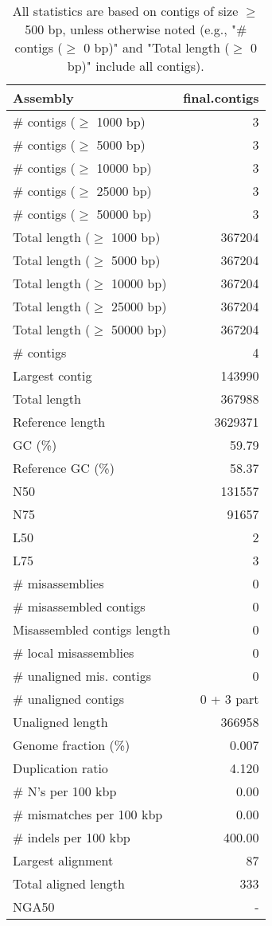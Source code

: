\documentclass[12pt,a4paper]{article}
\begin{document}
\begin{table}[ht]
\begin{center}
\caption{All statistics are based on contigs of size $\geq$ 500 bp, unless otherwise noted (e.g., "\# contigs ($\geq$ 0 bp)" and "Total length ($\geq$ 0 bp)" include all contigs).}
\begin{tabular}{|l*{1}{|r}|}
\hline
Assembly & final.contigs \\ \hline
\# contigs ($\geq$ 1000 bp) & 3 \\ \hline
\# contigs ($\geq$ 5000 bp) & 3 \\ \hline
\# contigs ($\geq$ 10000 bp) & 3 \\ \hline
\# contigs ($\geq$ 25000 bp) & 3 \\ \hline
\# contigs ($\geq$ 50000 bp) & 3 \\ \hline
Total length ($\geq$ 1000 bp) & 367204 \\ \hline
Total length ($\geq$ 5000 bp) & 367204 \\ \hline
Total length ($\geq$ 10000 bp) & 367204 \\ \hline
Total length ($\geq$ 25000 bp) & 367204 \\ \hline
Total length ($\geq$ 50000 bp) & 367204 \\ \hline
\# contigs & 4 \\ \hline
Largest contig & 143990 \\ \hline
Total length & 367988 \\ \hline
Reference length & 3629371 \\ \hline
GC (\%) & 59.79 \\ \hline
Reference GC (\%) & 58.37 \\ \hline
N50 & 131557 \\ \hline
N75 & 91657 \\ \hline
L50 & 2 \\ \hline
L75 & 3 \\ \hline
\# misassemblies & 0 \\ \hline
\# misassembled contigs & 0 \\ \hline
Misassembled contigs length & 0 \\ \hline
\# local misassemblies & 0 \\ \hline
\# unaligned mis. contigs & 0 \\ \hline
\# unaligned contigs & 0 + 3 part \\ \hline
Unaligned length & 366958 \\ \hline
Genome fraction (\%) & 0.007 \\ \hline
Duplication ratio & 4.120 \\ \hline
\# N's per 100 kbp & 0.00 \\ \hline
\# mismatches per 100 kbp & 0.00 \\ \hline
\# indels per 100 kbp & 400.00 \\ \hline
Largest alignment & 87 \\ \hline
Total aligned length & 333 \\ \hline
NGA50 & - \\ \hline
\end{tabular}
\end{center}
\end{table}
\end{document}
